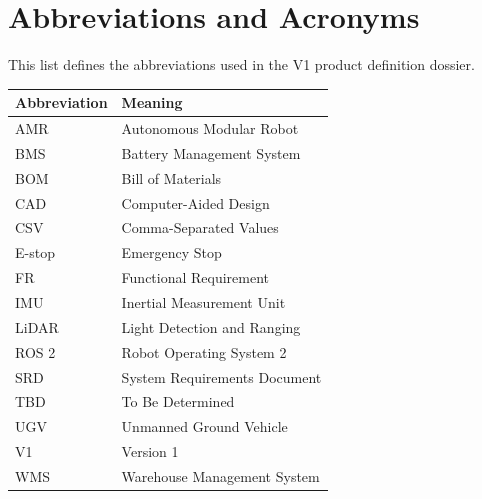 \chapter*{Abbreviations and Acronyms}

This list defines the abbreviations used in the V1 product definition dossier.

\begin{longtable}{p{}p{}}
\toprule
\textbf{Abbreviation} & \textbf{Meaning} \\
\midrule
\endhead
AMR & Autonomous Modular Robot \\
BMS & Battery Management System \\
BOM & Bill of Materials \\
CAD & Computer-Aided Design \\
CSV & Comma-Separated Values \\
E-stop & Emergency Stop \\
FR & Functional Requirement \\
IMU & Inertial Measurement Unit \\
LiDAR & Light Detection and Ranging \\
ROS 2 & Robot Operating System 2 \\
SRD & System Requirements Document \\
TBD & To Be Determined \\
UGV & Unmanned Ground Vehicle \\
V1 & Version 1 \\
WMS & Warehouse Management System \\
\bottomrule
\end{longtable}

